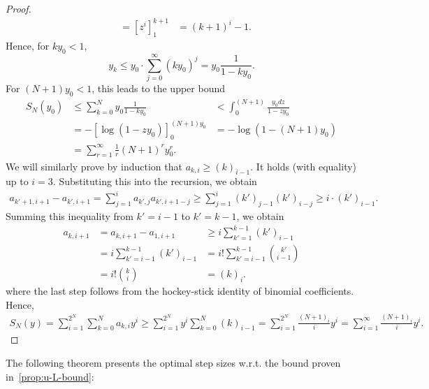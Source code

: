 \documentclass{article}
\begin{document}
\begin{toappendix}
\begin{proof}
\begin{eqnarray*}
        &=[z^i]_1^{k+1}
        &=(k+1)^i-1.
    \end{eqnarray*}
    Hence, for $ky_0<1$, 
    \[
    y_k\le y_0\cdot \sum_{j=0}^\infty(ky_0)^j=y_0\frac{1}{1-ky_0}.
    \]
    For $(N+1)y_0<1$, this leads to the upper bound
    \begin{eqnarray*}
    S_N(y_0)&\le\sum_{k=0}^Ny_0\frac{1}{1-ky_0}
    &<\int_{0}^{(N+1)}\frac{y_0dz}{1-zy_0}\\
    &=-\left[\log(1-zy_0)\right]_0^{(N+1)y_0}
    &=-\log(1-(N+1)y_0)\\
    &=\sum_{r=1}^\infty\frac1r(N+1)^ry_0^r.
    \end{eqnarray*}
    We will similarly prove by induction that $a_{k,i}\ge(k)_{i-1}$.
    It holds (with equality) up to $i=3$. Substituting this into the recursion, we obtain
    \begin{align*}
    a_{k'+1,i+1}-a_{k',i+1}=\sum_{j=1}^ia_{k',j}a_{k',i+1-j}
    \ge\sum_{j=1}^i(k')_{j-1}(k')_{i-j}
    \ge i\cdot (k')_{i-1}.
    \end{align*}
    Summing this inequality from $k'=i-1$ to $k'=k-1$, we obtain
    \begin{eqnarray*}
        a_{k,i+1}&=a_{k,i+1}-a_{1,i+1}&\ge i\sum_{k'=1}^{k-1}(k')_{i-1}\\
        &=i\sum_{k'=i-1}^{k-1}(k')_{i-1}
        &=i!\sum_{k'=i-1}^{k-1}{k'\choose i-1}\\
        &=i!{k\choose i}&=(k)_i.
    \end{eqnarray*}
    where the last step follows from the hockey-stick identity of binomial coefficients.
    Hence,
    \begin{eqnarray*}
    S_N(y)= \sum_{i=1}^{2^N}\sum_{k=0}^Na_{k,i}y^i
    \ge \sum_{i=1}^{2^N}y^i\sum_{k=0}^N(k)_{i-1}
    =\sum_{i=1}^{2^N}\frac{(N+1)_i}{i}y^i
    =\sum_{i=1}^\infty\frac{(N+1)_i}{i}y^i.
    \end{eqnarray*}
\end{proof}

The following theorem presents the optimal step sizes w.r.t. the bound proven in~\cref{prop:u-L-bound}:


\end{toappendix}
\end{document}
